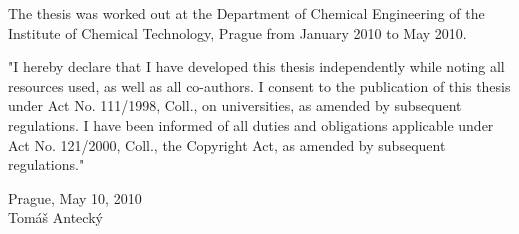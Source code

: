 The thesis was worked out at the Department of Chemical Engineering of the Institute of Chemical Technology, Prague from January 2010 to May 2010.

\vspace{16cm}
"I hereby declare that I have developed this thesis independently while noting all resources used, as well as all co-authors. I consent to the publication of this thesis under Act No. 111/1998, Coll., on universities, as amended by subsequent regulations. I have been informed of all duties and obligations applicable under Act No. 121/2000, Coll., the Copyright Act, as amended by subsequent regulations."

\vspace{1cm}
\noindent
Prague, May 10, 2010\\

\hspace{10cm}
Tomáš Antecký